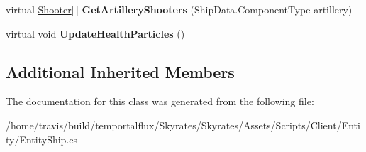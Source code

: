 \begin{DoxyCompactItemize}
\item 
\hypertarget{class_skyrates_1_1_common_1_1_entity_1_1_entity_ship_af998b01b2578a6aa22afedc6e74803fe}{virtual \hyperlink{class_shooter}{Shooter}\mbox{[}$\,$\mbox{]} {\bfseries Get\-Artillery\-Shooters} (Ship\-Data.\-Component\-Type artillery)}\label{class_skyrates_1_1_common_1_1_entity_1_1_entity_ship_af998b01b2578a6aa22afedc6e74803fe}

\item 
\hypertarget{class_skyrates_1_1_common_1_1_entity_1_1_entity_ship_a16626e842a5375f9b872b2c16043a2a8}{virtual void {\bfseries Update\-Health\-Particles} ()}\label{class_skyrates_1_1_common_1_1_entity_1_1_entity_ship_a16626e842a5375f9b872b2c16043a2a8}

\end{DoxyCompactItemize}
\subsection*{Additional Inherited Members}


The documentation for this class was generated from the following file\-:\begin{DoxyCompactItemize}
\item 
/home/travis/build/temportalflux/\-Skyrates/\-Skyrates/\-Assets/\-Scripts/\-Client/\-Entity/Entity\-Ship.\-cs\end{DoxyCompactItemize}
